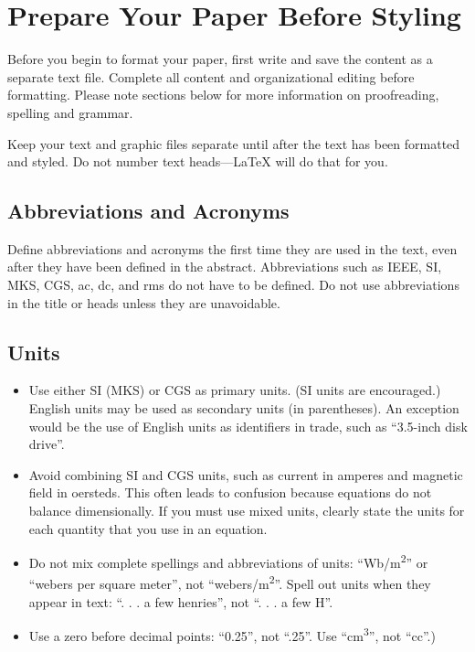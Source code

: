 \documentclass[conference]{IEEEtran}
\begin{document}
\section{Prepare Your Paper Before Styling}
Before you begin to format your paper, first write and save the content as a 
separate text file. Complete all content and organizational editing before 
formatting. Please note sections  below for more information on 
proofreading, spelling and grammar.

Keep your text and graphic files separate until after the text has been 
formatted and styled. Do not number text heads---{\LaTeX} will do that 
for you.

\subsection{Abbreviations and Acronyms}\label{AA}
Define abbreviations and acronyms the first time they are used in the text, 
even after they have been defined in the abstract. Abbreviations such as 
IEEE, SI, MKS, CGS, ac, dc, and rms do not have to be defined. Do not use 
abbreviations in the title or heads unless they are unavoidable.

\subsection{Units}
\begin{itemize}
\item Use either SI (MKS) or CGS as primary units. (SI units are encouraged.) English units may be used as secondary units (in parentheses). An exception would be the use of English units as identifiers in trade, such as ``3.5-inch disk drive''.
\item Avoid combining SI and CGS units, such as current in amperes and magnetic field in oersteds. This often leads to confusion because equations do not balance dimensionally. If you must use mixed units, clearly state the units for each quantity that you use in an equation.
\item Do not mix complete spellings and abbreviations of units: ``Wb/m\textsuperscript{2}'' or ``webers per square meter'', not ``webers/m\textsuperscript{2}''. Spell out units when they appear in text: ``. . . a few henries'', not ``. . . a few H''.
\item Use a zero before decimal points: ``0.25'', not ``.25''. Use ``cm\textsuperscript{3}'', not ``cc''.)
\end{itemize}
\end{document}
